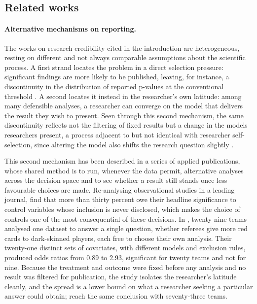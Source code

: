 \subsection{Related works}
\label{sec:literature-review}

\paragraph{Alternative mechanisms on reporting.} The works on research credibility cited in the introduction are heterogeneous,
resting on different and not always comparable assumptions about the scientific
process. A first strand locates the problem in a direct selection pressure:
significant findings are more likely to be published, leaving, for instance, a
discontinuity in the distribution of reported p-values at the conventional
threshold
\citep{rosenthal1979file,franco2014publication,andrews2019identification}. A
second locates it instead in the researcher's own latitude: among many
defensible analyses, a researcher can converge on the model that delivers the
result they wish to present. Seen through this second mechanism, the same
discontinuity reflects not the filtering of fixed results but a change in the
models researchers present, a process adjacent to but not identical with
researcher self-selection, since altering the model also shifts the research
question slightly \citep{brodeur2016star,elliott2022detecting}.



This second mechanism has been described in a series of applied publications,
whose shared method is to run, whenever the data permit, alternative analyses
across the decision space and to see whether a result still stands once less
favourable choices are made. Re-analysing observational studies in a leading
journal, \citet{lenz2021achieving} find that more than thirty percent owe their
headline significance to control variables whose inclusion is never disclosed,
which makes the choice of controls one of the most consequential of these
decisions. In \citet{silberzahn2018many}, twenty-nine teams analysed one dataset
to answer a single question, whether referees give more red cards to
dark-skinned players, each free to choose their own analysis. Their twenty-one
distinct sets of covariates, with different models and exclusion rules, produced
odds ratios from 0.89 to 2.93, significant for twenty teams and not for nine.
Because the treatment and outcome were fixed before any analysis and no result
was filtered for publication, the study isolates the researcher's latitude
cleanly, and the spread is a lower bound on what a researcher seeking a
particular answer could obtain; \citet{breznau2022hidden} reach the same
conclusion with seventy-three teams. 


